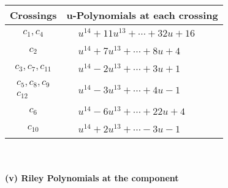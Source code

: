 \documentclass[1p]{elsarticle_modified}
\theoremstyle{definition}
\begin{document}
\begin{tabular}{m{50pt}|m{274pt}}
Crossings & \hspace{64pt}u-Polynomials at each crossing \\
\hline $$\begin{aligned}c_{1},c_{4}\end{aligned}$$&$\begin{aligned}
&u^{14}+11 u^{13}+\cdots+32 u+16
\end{aligned}$\\
\hline $$\begin{aligned}c_{2}\end{aligned}$$&$\begin{aligned}
&u^{14}+7 u^{13}+\cdots+8 u+4
\end{aligned}$\\
\hline $$\begin{aligned}c_{3},c_{7},c_{11}\end{aligned}$$&$\begin{aligned}
&u^{14}-2 u^{13}+\cdots+3 u+1
\end{aligned}$\\
\hline $$\begin{aligned}c_{5},c_{8},c_{9}\\c_{12}\end{aligned}$$&$\begin{aligned}
&u^{14}-3 u^{13}+\cdots+4 u-1
\end{aligned}$\\
\hline $$\begin{aligned}c_{6}\end{aligned}$$&$\begin{aligned}
&u^{14}-6 u^{13}+\cdots+22 u+4
\end{aligned}$\\
\hline $$\begin{aligned}c_{10}\end{aligned}$$&$\begin{aligned}
&u^{14}+2 u^{13}+\cdots-3 u-1
\end{aligned}$\\
\hline
\end{tabular}\\~\\
\newpage\renewcommand{\arraystretch}{1}
\flushleft \textbf{(v) Riley Polynomials at the component}\newline \\
\end{document}
